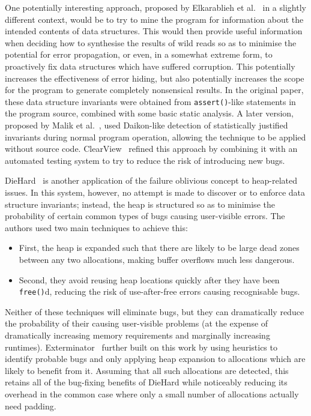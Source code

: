 One potentially interesting approach, proposed by Elkarablieh et
al.~\cite{Elkarablieh2007} in a slightly different context, would be
to try to mine the program for information about the intended contents
of data structures.  This would then provide useful information when
deciding how to synthesise the results of wild reads so as to minimise
the potential for error propagation, or even, in a somewhat extreme
form, to proactively fix data structures which have suffered
corruption.  This potentially increases the effectiveness of error
hiding, but also potentially increases the scope for the program to
generate completely nonsensical results.  In the original paper, these
data structure invariants were obtained from \verb|assert()|-like
statements in the program source, combined with some basic static
analysis.  A later version, proposed by Malik et al.~\cite{Malik},
used Daikon-like detection of statistically justified invariants
during normal program operation, allowing the technique to be applied
without source code.  ClearView~\cite{Perkins} refined this approach
by combining it with an automated testing system to try to reduce the
risk of introducing new bugs.

DieHard~\cite{Berger2006} is another application of the failure
oblivious concept to heap-related issues.  In this system, however, no
attempt is made to discover or to enforce data structure invariants;
instead, the heap is structured so as to minimise the probability of
certain common types of bugs causing user-visible errors.  The authors
used two main techniques to achieve this:
\begin{itemize}
\item First, the heap is expanded such that there are likely to be
  large dead zones between any two allocations, making buffer
  overflows much less dangerous.
\item Second, they avoid reusing heap locations quickly after they
  have been \texttt{free()}d, reducing the risk of use-after-free
  errors causing recognisable bugs.
\end{itemize}
Neither of these techniques will eliminate bugs, but they can
dramatically reduce the probability of their causing user-visible
problems (at the expense of dramatically increasing memory
requirements and marginally increasing runtimes).
Exterminator~\cite{Novark2007} further built on this work by using
heuristics to identify probable bugs and only applying heap expansion
to allocations which are likely to benefit from it.  Assuming that all
such allocations are detected, this retains all of the bug-fixing
benefits of DieHard while noticeably reducing its overhead in the
common case where only a small number of allocations actually need
padding.

